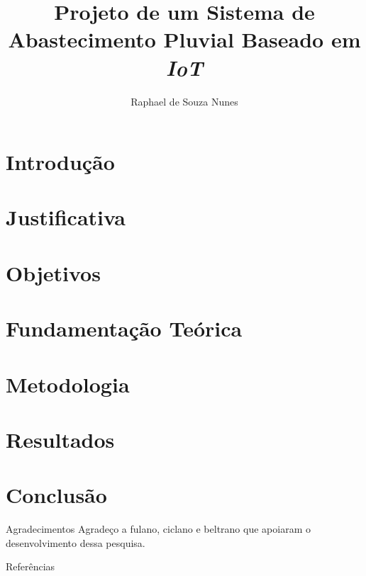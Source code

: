 \documentclass[11pt]{beamer}
\title[Trabalho de Conclusão de Curso]{Projeto de um Sistema de Abastecimento Pluvial Baseado em \textit{IoT}}
\author[Nunes, de S. R.]{Raphael de Souza Nunes}
\begin{document}


\section{Introdução} 


\section{Justificativa}


\section{Objetivos}


\section{Fundamentação Teórica}


\section{Metodologia}


\section{Resultados}


\section{Conclusão}


\begin{frame}{Agradecimentos}
    \large{Agradeço a fulano, ciclano e beltrano que apoiaram o desenvolvimento dessa pesquisa.}
\end{frame}


\nocite{*}
\begin{frame}[allowframebreaks]{Referências}


\end{frame}


\begin{frame}
\titlepage 
\end{frame}
\end{document}
